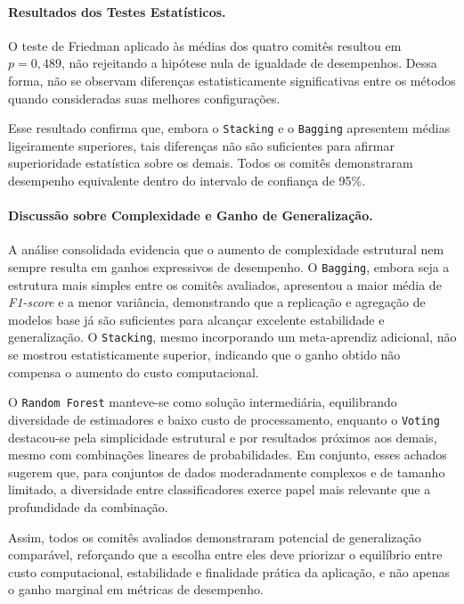 \documentclass[12pt]{article}
\begin{document}
\paragraph{Resultados dos Testes Estatísticos.}

O teste de Friedman aplicado às médias dos quatro comitês resultou em \( p = 0{,}489 \), não rejeitando a hipótese nula de igualdade de desempenhos.  
Dessa forma, não se observam diferenças estatisticamente significativas entre os métodos quando consideradas suas melhores configurações.  

Esse resultado confirma que, embora o \texttt{Stacking} e o \texttt{Bagging} apresentem médias ligeiramente superiores, tais diferenças não são suficientes para afirmar superioridade estatística sobre os demais.  
Todos os comitês demonstraram desempenho equivalente dentro do intervalo de confiança de 95\%.

\paragraph{Discussão sobre Complexidade e Ganho de Generalização.}

A análise consolidada evidencia que o aumento de complexidade estrutural nem sempre resulta em ganhos expressivos de desempenho.  
O \texttt{Bagging}, embora seja a estrutura mais simples entre os comitês avaliados, apresentou a maior média de \textit{F1-score} e a menor variância, demonstrando que a replicação e agregação de modelos base já são suficientes para alcançar excelente estabilidade e generalização.  
O \texttt{Stacking}, mesmo incorporando um meta-aprendiz adicional, não se mostrou estatisticamente superior, indicando que o ganho obtido não compensa o aumento do custo computacional.

O \texttt{Random Forest} manteve-se como solução intermediária, equilibrando diversidade de estimadores e baixo custo de processamento, enquanto o \texttt{Voting} destacou-se pela simplicidade estrutural e por resultados próximos aos demais, mesmo com combinações lineares de probabilidades.  
Em conjunto, esses achados sugerem que, para conjuntos de dados moderadamente complexos e de tamanho limitado, a diversidade entre classificadores exerce papel mais relevante que a profundidade da combinação.

Assim, todos os comitês avaliados demonstraram potencial de generalização comparável, reforçando que a escolha entre eles deve priorizar o equilíbrio entre custo computacional, estabilidade e finalidade prática da aplicação, e não apenas o ganho marginal em métricas de desempenho.
\end{document}
